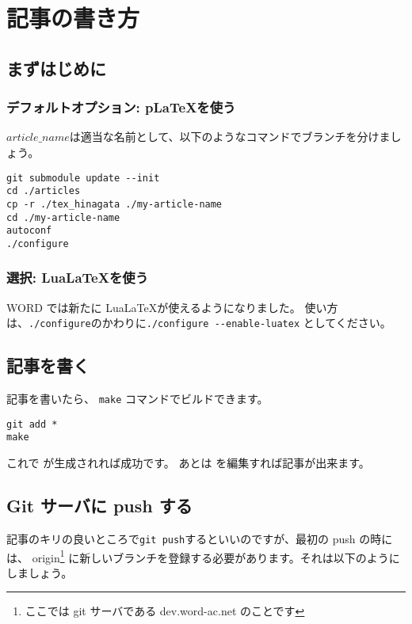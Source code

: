 \subtitle{ヘッダの見出し}
\author{ほげ}

\chapter{記事の書き方}

\section{まずはじめに}

\subsection{デフォルトオプション: p\LaTeX を使う}

$article\_name$は適当な名前として、以下のようなコマンドでブランチを分けましょう。

\begin{lstlisting}[mathescape]
git submodule update --init
cd ./articles
cp -r ./tex_hinagata ./my-article-name
cd ./my-article-name
autoconf
./configure
\end{lstlisting}

\subsection{選択: Lua\LaTeX を使う}

WORD では新たに Lua\LaTeX が使えるようになりました。
使い方は、\lstinline|./configure|のかわりに\lstinline|./configure --enable-luatex| としてください。

\section{記事を書く}

記事を書いたら、 \lstinline|make| コマンドでビルドできます。

\begin{lstlisting}
git add *
make
\end{lstlisting}

これで が生成されれば成功です。
あとは を編集すれば記事が出来ます。

\section{Git サーバに push する}

記事のキリの良いところで\lstinline|git push|するといいのですが、最初の push の時には、
origin\footnote{ここでは git サーバである dev.word-ac.net のことです}
に新しいブランチを登録する必要があります。それは以下のようにしましょう。

